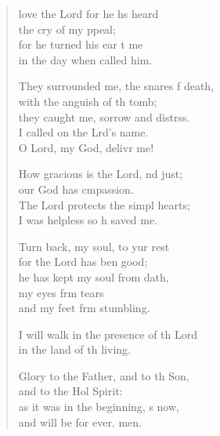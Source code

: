 \settowidth{\versewidth}{They surrounded me, the snares of death, *}
\begin{verse}%
  \begin{patverse}
 love the Lord for he hs heard\Med\\
the cry of my ppeal;\\
for he turned his ear t me\Med\\
in the day when  called him.

They surrounded me, the snares f death,\Med\\
with the anguish of th tomb;\\
they caught me, sorrow and distrss.\Flex\\
I called on the Lrd’s name.\Med\\
O Lord, my God, delivr me!

How gracious is the Lord, nd just;\Med\\
our God has cmpassion.\\
The Lord protects the simpl hearts;\Med\\
I was helpless so h saved me.

Turn back, my soul, to yur rest\Med\\
for the Lord has ben good;\\
he has kept my soul from dath,\Flex\\
my eyes frm tears\Med\\
and my feet frm stumbling.

I will walk in the presence of th Lord\Med\\
in the land of th living.

Glory to the Father, and to th Son,\Med\\
and to the Hol Spirit:\\
as it was in the beginning, \pointup{\i}s now,\Med\\
and will be for ever. men.
  \end{patverse}
\end{verse}
